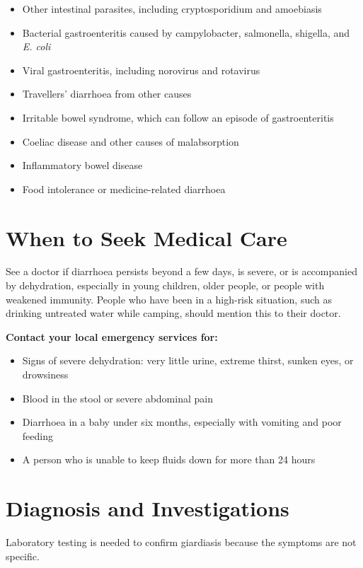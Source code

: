 \begin{itemize}
    \item Other intestinal parasites, including cryptosporidium and amoebiasis
    \item Bacterial gastroenteritis caused by campylobacter, salmonella, shigella, and \textit{E. coli}
    \item Viral gastroenteritis, including norovirus and rotavirus
    \item Travellers' diarrhoea from other causes
    \item Irritable bowel syndrome, which can follow an episode of gastroenteritis
    \item Coeliac disease and other causes of malabsorption
    \item Inflammatory bowel disease
    \item Food intolerance or medicine-related diarrhoea
\end{itemize}

\section*{When to Seek Medical Care}
See a doctor if diarrhoea persists beyond a few days, is severe, or is accompanied by dehydration, especially in young children, older people, or people with weakened immunity. People who have been in a high-risk situation, such as drinking untreated water while camping, should mention this to their doctor.

\textbf{Contact your local emergency services for:}
\begin{itemize}
    \item Signs of severe dehydration: very little urine, extreme thirst, sunken eyes, or drowsiness
    \item Blood in the stool or severe abdominal pain
    \item Diarrhoea in a baby under six months, especially with vomiting and poor feeding
    \item A person who is unable to keep fluids down for more than 24 hours
\end{itemize}

\section*{Diagnosis and Investigations}
Laboratory testing is needed to confirm giardiasis because the symptoms are not specific.

